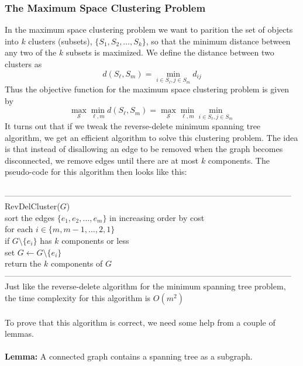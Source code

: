 \documentclass{article}
\newcommand{\lem}{\textbf{Lemma: }}
\newcommand{\mcal}[1]{\mathcal{#1}}
\begin{document}
\subsubsection{The Maximum Space Clustering Problem}
In the maximum space clustering problem we want to parition the set of objects into $k$ clusters (subsets), $\{S_1, S_2, \dots, S_k\}$, so that the minimum distance between any two of the $k$ subsets is maximized. We define the distance between two clusters as
\[d(S_{\ell}, S_m) = \min_{i \in S_{\ell}, j\in S_m} d_{ij}\]
Thus the objective function for the maximum space clustering problem is given by
\[\max_{\mcal{S}} \min_{\ell, m} d(S_{\ell}, S_m) = \max_{\mcal{S}} \min_{\ell, m} \min_{i \in S_{\ell}, j \in S_m}\]
It turns out that if we tweak the reverse-delete minimum spanning tree algorithm, we get an efficient algorithm to solve this clustering problem. The idea is that instead of disallowing an edge to be removed when the graph becomes disconnected, we remove edges until there are at most $k$ components. The pseudo-code for this algorithm then looks like this:\\\\
---------------------------------------------------------------------------------------------------------
RevDelCluster($G$)\\
	\hspace*{7mm} sort the edges $\{e_1, e_2, \dots, e_m\}$ in increasing order by cost\\
	\hspace*{7mm} for each $i \in \{m, m-1, \dots, 2, 1\}$\\
	\hspace*{14mm} if $G \setminus \{e_i\}$ has $k$ components or less\\
	\hspace*{21mm} set $G \leftarrow G \setminus \{e_i\}$\\
	\hspace*{7mm} return the $k$ components of $G$\\
---------------------------------------------------------------------------------------------------------\\
Just like the reverse-delete algorithm for the minimum spanning tree problem, the time complexity for this algorithm is $O(m^2)$\\\\
To prove that this algorithm is correct, we need some help from a couple of lemmas.\\\\
\lem A connected graph contains a spanning tree as a subgraph.\\\\
\end{document}
